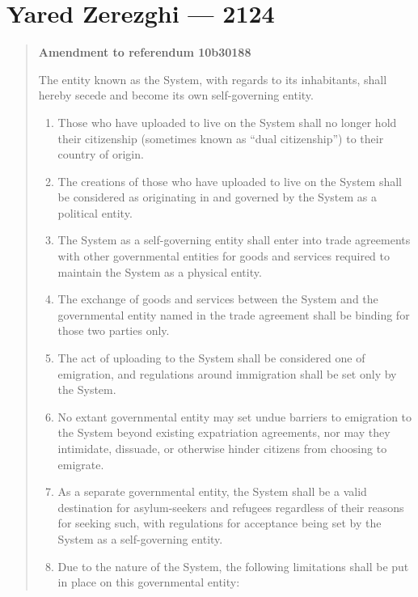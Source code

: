 \hypertarget{yared-zerezghi-2124}{%
\chapter{Yared Zerezghi — 2124}\label{yared-zerezghi-2124}}

\begin{quote}
\textbf{Amendment to referendum 10b30188}

The entity known as the System, with regards to its inhabitants, shall hereby secede and become its own self-governing entity.

\begin{enumerate}
\def\labelenumi{\arabic{enumi}.}
\tightlist
\item
  Those who have uploaded to live on the System shall no longer hold their citizenship (sometimes known as ``dual citizenship'') to their country of origin.
\item
  The creations of those who have uploaded to live on the System shall be considered as originating in and governed by the System as a political entity.
\item
  The System as a self-governing entity shall enter into trade agreements with other governmental entities for goods and services required to maintain the System as a physical entity.
\item
  The exchange of goods and services between the System and the governmental entity named in the trade agreement shall be binding for those two parties only.
\item
  The act of uploading to the System shall be considered one of emigration, and regulations around immigration shall be set only by the System.
\item
  No extant governmental entity may set undue barriers to emigration to the System beyond existing expatriation agreements, nor may they intimidate, dissuade, or otherwise hinder citizens from choosing to emigrate.
\item
  As a separate governmental entity, the System shall be a valid destination for asylum-seekers and refugees regardless of their reasons for seeking such, with regulations for acceptance being set by the System as a self-governing entity.
\item
  Due to the nature of the System, the following limitations shall be put in place on this governmental entity:


\end{enumerate}
\end{quote}
